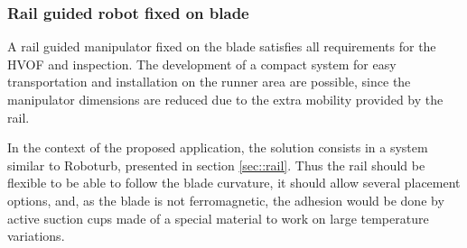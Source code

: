 \subsubsection{Rail guided robot fixed on blade}\label{proj_rail} 
A rail
guided manipulator fixed on the blade satisfies all requirements for the HVOF and inspection. The development of a compact system for easy transportation and installation on
the runner area are possible, since the manipulator dimensions are reduced due
to the extra mobility provided by the rail.


In the context of the proposed application, the solution consists in a system
similar to Roboturb, presented in section \ref{sec::rail}. Thus the rail should
be flexible to be able to follow the blade curvature, it should allow several
placement options, and, as the blade is not ferromagnetic, the adhesion would
be done by active suction cups made of a special material to work on large
temperature variations.




